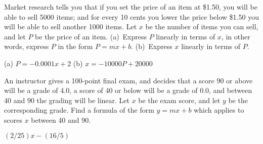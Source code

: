 \begin{exercises}
\exercise
Market research tells you that if you set the price of an item at
\$1.50, you will be able to sell 5000 items; and for every 10 cents you
lower the price below \$1.50 you will be able to sell another 1000 items.
Let $x$ be the number of items you can sell, and let $P$ be the price of
an item.  (a)~Express $P$ linearly in terms of $x$, in other words,
express $P$ in the form $P=mx+b$.  (b)~Express $x$
linearly in terms of $P$.
\begin{answer} (a) $P=-0.0001x+2$
(b) $x=-10000P+20000$
\end{answer}

\exercise
An instructor gives a 100-point final exam, and decides that a score
90 or above will be a grade of 4.0, a score of 40 or below will be a grade
of 0.0, and between 40 and 90 the grading will be linear.  Let $x$ be
the exam score, and let $y$ be the corresponding grade.  Find a formula
of the form $y=mx+b$ which applies to scores $x$ between 40 and 90.
\begin{answer} $(2/25)x-(16/5)$
\end{answer}

\end{exercises}



